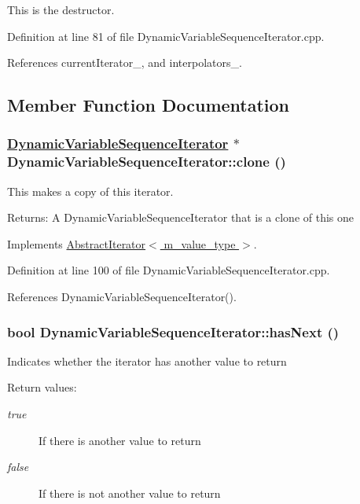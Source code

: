 This is the destructor. 

Definition at line 81 of file Dynamic\-Variable\-Sequence\-Iterator.cpp.

References current\-Iterator\_\-, and interpolators\_\-.

\subsection{Member Function Documentation}
\hypertarget{classDynamicVariableSequenceIterator_a2}{
\subsubsection[clone]{\setlength{\rightskip}{0pt plus 5cm}\hyperlink{classDynamicVariableSequenceIterator}{Dynamic\-Variable\-Sequence\-Iterator} $\ast$ Dynamic\-Variable\-Sequence\-Iterator::clone ()}}
\label{classDynamicVariableSequenceIterator_a2}


This makes a copy of this iterator. \begin{Desc}
\item[Returns:]A Dynamic\-Variable\-Sequence\-Iterator that is a clone of this one \end{Desc}


Implements \hyperlink{classAbstractIterator_a0}{Abstract\-Iterator$<$ m\_\-value\_\-type $>$}.

Definition at line 100 of file Dynamic\-Variable\-Sequence\-Iterator.cpp.

References Dynamic\-Variable\-Sequence\-Iterator().\hypertarget{classDynamicVariableSequenceIterator_a3}{
\subsubsection[hasNext]{\setlength{\rightskip}{0pt plus 5cm}bool Dynamic\-Variable\-Sequence\-Iterator::has\-Next ()}}
\label{classDynamicVariableSequenceIterator_a3}


Indicates whether the iterator has another value to return \begin{Desc}
\item[Return values:]
\begin{description}
\item[{\em true}]If there is another value to return \item[{\em false}]If there is not another value to return \end{description}
\end{Desc}


